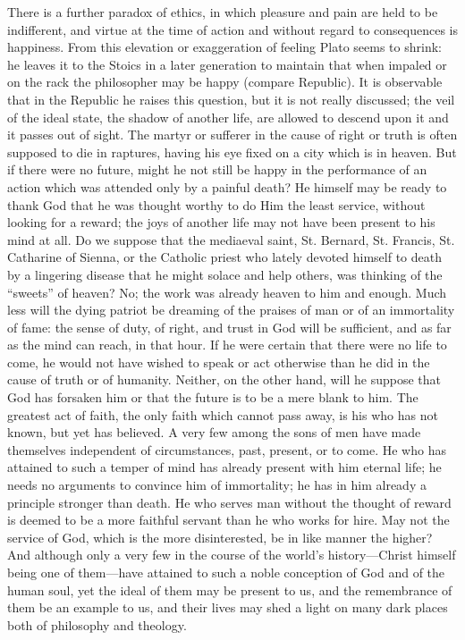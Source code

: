 \documentclass[11pt,letter]{article}
\begin{document}
\par  There is a further paradox of ethics, in which pleasure and pain are held to be indifferent, and virtue at the time of action and without regard to consequences is happiness. From this elevation or exaggeration of feeling Plato seems to shrink: he leaves it to the Stoics in a later generation to maintain that when impaled or on the rack the philosopher may be happy (compare Republic). It is observable that in the Republic he raises this question, but it is not really discussed; the veil of the ideal state, the shadow of another life, are allowed to descend upon it and it passes out of sight. The martyr or sufferer in the cause of right or truth is often supposed to die in raptures, having his eye fixed on a city which is in heaven. But if there were no future, might he not still be happy in the performance of an action which was attended only by a painful death? He himself may be ready to thank God that he was thought worthy to do Him the least service, without looking for a reward; the joys of another life may not have been present to his mind at all. Do we suppose that the mediaeval saint, St. Bernard, St. Francis, St. Catharine of Sienna, or the Catholic priest who lately devoted himself to death by a lingering disease that he might solace and help others, was thinking of the “sweets” of heaven? No; the work was already heaven to him and enough. Much less will the dying patriot be dreaming of the praises of man or of an immortality of fame: the sense of duty, of right, and trust in God will be sufficient, and as far as the mind can reach, in that hour. If he were certain that there were no life to come, he would not have wished to speak or act otherwise than he did in the cause of truth or of humanity. Neither, on the other hand, will he suppose that God has forsaken him or that the future is to be a mere blank to him. The greatest act of faith, the only faith which cannot pass away, is his who has not known, but yet has believed. A very few among the sons of men have made themselves independent of circumstances, past, present, or to come. He who has attained to such a temper of mind has already present with him eternal life; he needs no arguments to convince him of immortality; he has in him already a principle stronger than death. He who serves man without the thought of reward is deemed to be a more faithful servant than he who works for hire. May not the service of God, which is the more disinterested, be in like manner the higher? And although only a very few in the course of the world’s history—Christ himself being one of them—have attained to such a noble conception of God and of the human soul, yet the ideal of them may be present to us, and the remembrance of them be an example to us, and their lives may shed a light on many dark places both of philosophy and theology.
\end{document}
